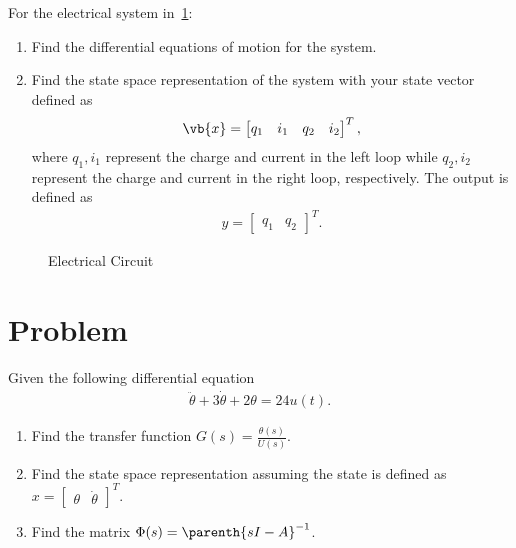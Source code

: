 \documentclass[titlepage, 11pt, reqno]{article}    %
\begin{document}
For the electrical system in~\cref{fig:elec_circuit_2}:
\begin{enumerate}
    \item Find the differential equations of motion for the system.
    \item Find the state space representation of the system with your state vector defined as
        \begin{align*}
        \vb{x} = \begin{bmatrix}q_1 & i_1 & q_2 & i_2\end{bmatrix}^T,
        \end{align*}
        where \(q_1, i_1\) represent the charge and current in the left loop while \(q_2, i_2\) represent the charge and current in the right loop, respectively. 
        The output is defined as
        \begin{align*}
        y = \begin{bmatrix} q_1 & q_2 \end{bmatrix}^T.
        \end{align*}
\end{enumerate}
\begin{figure}[htbp]
\centering
\begin{scaletikzpicturetowidth}{0.8\textwidth}
\end{scaletikzpicturetowidth}
\caption{Electrical Circuit~\label{fig:elec_circuit_2}}
\end{figure}
\clearpage
\newpage
\mbox{}
\clearpage

\section{Problem}
Given the following differential equation
\begin{align*}
    \ddot{\theta} + 3 \dot{\theta} + 2 \theta = 24 u(t).
\end{align*}

\begin{enumerate}
    \item Find the transfer function \( G(s) = \frac{\theta(s)}{U(s)} \).
    \item Find the state space representation assuming the state is  defined as \( x = \begin{bmatrix} \theta & \dot{\theta}\end{bmatrix}^T\).
    \item Find the matrix \( \Phi(s) = \parenth{sI - A}^{-1}\).
\end{enumerate}
\clearpage
\newpage
\clearpage

\end{document}
